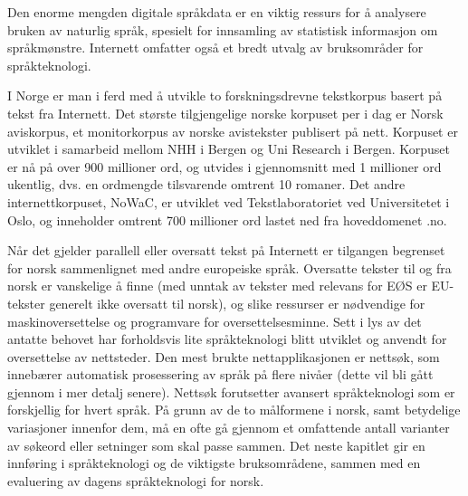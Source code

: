 \begin{multicols}{2}

Den enorme mengden digitale språkdata er en viktig ressurs for å analysere bruken av naturlig språk, spesielt for innsamling av statistisk informasjon om språkmønstre. Internett omfatter også et bredt utvalg av bruksområder for språkteknologi.

I Norge er man i ferd med å utvikle to forskningsdrevne tekstkorpus basert på tekst fra Internett. 
Det største tilgjengelige norske korpuset per i dag er Norsk aviskorpus, et monitorkorpus av norske avistekster publisert på nett.
Korpuset er utviklet i samarbeid mellom NHH i Bergen og Uni Research i Bergen. Korpuset er nå på over 900 millioner ord, og utvides i gjennomsnitt med 1 millioner ord ukentlig, dvs. en ordmengde tilsvarende omtrent 10 romaner.  
Det andre internettkorpuset, NoWaC, er utviklet ved Tekstlaboratoriet ved Universitetet i Oslo, og inneholder omtrent 700 millioner ord lastet ned fra hoveddomenet .no. 

Når det gjelder parallell eller oversatt tekst på Internett er tilgangen begrenset for norsk sammenlignet med andre europeiske språk. 
Oversatte tekster til og fra norsk er vanskelige å finne (med unntak av tekster med relevans for EØS er EU-tekster generelt ikke oversatt til norsk), og slike ressurser er nødvendige for maskinoversettelse og programvare for oversettelsesminne. 
Sett i lys av det antatte behovet har forholdsvis lite språkteknologi blitt utviklet og anvendt for oversettelse av nettsteder.
Den mest brukte nettapplikasjonen er nettsøk, som innebærer automatisk prosessering av språk på flere nivåer (dette vil bli gått gjennom i mer detalj senere). Nettsøk forutsetter avansert språkteknologi som er forskjellig for hvert språk. 
På grunn av de to målformene i norsk, samt betydelige variasjoner innenfor dem, må en ofte gå gjennom et omfattende antall varianter av søkeord eller setninger som skal passe sammen.
Det neste kapitlet gir en innføring i språkteknologi og de viktigste bruksområdene, sammen med en evaluering av dagens språkteknologi for norsk.

\end{multicols}

\clearpage


